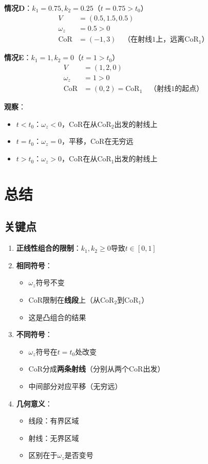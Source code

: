 \documentclass[12pt,a4paper]{article}
\begin{document}
\textbf{情况D}：$k_1 = 0.75, k_2 = 0.25$（$t = 0.75 > t_0$）
\begin{align}
V &= (0.5, 1.5, 0.5) \\
\omega_z &= 0.5 > 0 \\
\text{CoR} &= (-1, 3) \quad \text{（在射线1上，远离CoR$_1$）}
\end{align}

\textbf{情况E}：$k_1 = 1, k_2 = 0$（$t = 1 > t_0$）
\begin{align}
V &= (1, 2, 0) \\
\omega_z &= 1 > 0 \\
\text{CoR} &= (0, 2) = \text{CoR}_1 \quad \text{（射线1的起点）}
\end{align}

\textbf{观察}：
\begin{itemize}
\item $t < t_0$：$\omega_z < 0$，CoR在从CoR$_2$出发的射线上
\item $t = t_0$：$\omega_z = 0$，平移，CoR在无穷远
\item $t > t_0$：$\omega_z > 0$，CoR在从CoR$_1$出发的射线上
\end{itemize}

\section{总结}

\subsection{关键点}

\begin{enumerate}
\item \textbf{正线性组合的限制}：$k_1, k_2 \geq 0$导致$t \in [0, 1]$

\item \textbf{相同符号}：
   \begin{itemize}
   \item $\omega_z$符号不变
   \item CoR限制在\textbf{线段}上（从CoR$_2$到CoR$_1$）
   \item 这是凸组合的结果
   \end{itemize}

\item \textbf{不同符号}：
   \begin{itemize}
   \item $\omega_z$符号在$t = t_0$处改变
   \item CoR分成\textbf{两条射线}（分别从两个CoR出发）
   \item 中间部分对应平移（无穷远）
   \end{itemize}

\item \textbf{几何意义}：
   \begin{itemize}
   \item 线段：有界区域
   \item 射线：无界区域
   \item 区别在于$\omega_z$是否变号
   \end{itemize}
\end{enumerate}
\end{document}
